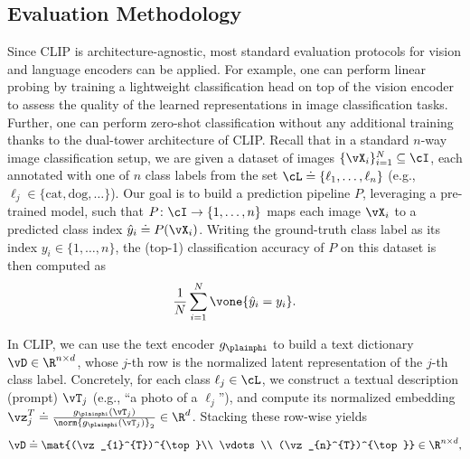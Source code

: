 \documentclass[../../book-main.tex]{subfiles}
\begin{document}
\subsection{Evaluation Methodology}\label{sub:clip_eval}
Since CLIP is architecture-agnostic, most standard evaluation protocols for vision and language encoders can be applied.
For example, one can perform linear probing by training a lightweight classification head on top of the vision encoder to assess the quality of the learned representations in image classification tasks.
Further, one can perform zero-shot classification without any additional training thanks to the dual-tower architecture of CLIP.
Recall that in a standard \(n\)-way image classification setup, we are given a dataset of images
\(\{\vX_{i}\}_{i=1}^{N} \subseteq \cI\), each annotated with one of \(n\) class labels from the set
\(\cL \doteq \{\ell_{1}, \dots, \ell_{n}\}\) (e.g., \(\ell_{j} \in \{\text{cat}, \text{dog}, \dots\}\)).
Our goal is to build a prediction pipeline \(P\), leveraging a pre-trained model, such that
\(P \colon \cI \to \{1, \dots, n\}\) maps each image \(\vX_{i}\) to a predicted class index
\(\hat{y}_{i} \doteq P(\vX_{i})\).
Writing the ground-truth class label as its index \(y_{i} \in \{1, \dots, n\}\),
the (top-1) classification accuracy of \(P\) on this dataset is then computed as
\begin{equation}
\frac{1}{N}\sum_{i=1}^{N}\vone\{\hat{y}_{i} = y_{i}\} .
\end{equation}

In CLIP, we can use the text encoder \(g_{\plainphi}\) to build a text dictionary \(\vD \in \R^{n \times d}\), whose \(j\)-th row is the normalized latent representation of the \(j\)-th class label.
Concretely, for each class \(\ell_{j} \in \cL\), we construct a textual description (prompt) \(\vT_{j}\) (e.g.,
``a photo of a \(\ell_{j}\)''), and compute its normalized embedding
\(\vz_{j}^{T} \doteq \frac{g_{\plainphi}(\vT_{j})}{\norm{g_{\plainphi}(\vT_{j})}_{2}} \in \R^{d}\).
Stacking these row-wise yields
\begin{equation}
\vD \doteq 
\mat{(\vz_{1}^{T})^{\top}\\ \vdots \\ (\vz_{n}^{T})^{\top}}
\in \R^{n \times d} ,
\end{equation}
\end{document}
